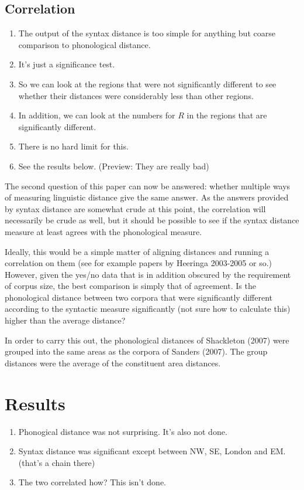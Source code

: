 \documentclass[11pt]{article}
\begin{document}
\subsection{Correlation}
\begin{enumerate}
\item The output of the syntax distance is too simple for anything but
  coarse comparison to phonological distance.
\item It's just a significance test.
\item So we can look at the regions that were not significantly
  different to see whether their distances were considerably less than
  other regions.
\item In addition, we can look at the numbers for $R$ in the regions
  that are significantly different.
\item There is no hard limit for this.
\item See the results below. (Preview: They are really bad)
\end{enumerate}
The second question of this paper can now be answered: whether
multiple ways of measuring linguistic distance give the same
answer. As the answers provided by syntax distance are somewhat crude
at this point, the correlation will necessarily be crude as well, but
it should be possible to see if the syntax distance measure at least
agrees with the phonological measure.

Ideally, this would be a simple matter of aligning distances and
running a correlation on them (see for example papers by Heeringa
2003-2005 or so.) However, given the yes/no data that is in addition
obscured by the requirement of corpus size, the best comparison is
simply that of agreement. Is the phonological distance between two corpora that
were significantly different according to the syntactic measure
significantly (not sure how to calculate this) higher than the average
distance?

In order to carry this out, the phonological distances of Shackleton
(2007) were grouped into the same areas as the corpora of Sanders
(2007). The group distances were the average of the constituent area distances.
\section{Results}
\begin{enumerate}
\item Phonogical distance was not surprising. It's also not done.
\item Syntax distance was significant except between NW, SE,
  London and EM. (that's a chain there)
\item The two correlated how? This isn't done.
\end{enumerate}
\end{document}
